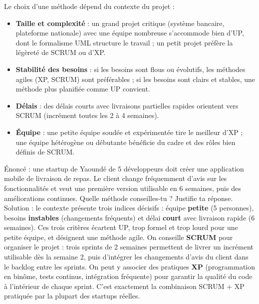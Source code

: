 \documentclass[11pt]{article}
\begin{document}
\begin{propriete}
Le choix d'une méthode dépend du contexte du projet :
\begin{itemize}
  \item \textbf{Taille et complexité} : un grand projet critique (système bancaire, plateforme nationale) avec une équipe nombreuse s'accommode bien d'UP, dont le formalisme UML structure le travail ; un petit projet préfère la légèreté de SCRUM ou d'XP.
  \item \textbf{Stabilité des besoins} : si les besoins sont flous ou évolutifs, les méthodes agiles (XP, SCRUM) sont préférables ; si les besoins sont clairs et stables, une méthode plus planifiée comme UP convient.
  \item \textbf{Délais} : des délais courts avec livraisons partielles rapides orientent vers SCRUM (incrément toutes les 2 à 4 semaines).
  \item \textbf{Équipe} : une petite équipe soudée et expérimentée tire le meilleur d'XP ; une équipe hétérogène ou débutante bénéficie du cadre et des rôles bien définis de SCRUM.
\end{itemize}
\end{propriete}

\begin{exoresolu}
Énoncé : une startup de Yaoundé de 5 développeurs doit créer une application mobile de livraison de repas. Le client change fréquemment d'avis sur les fonctionnalités et veut une première version utilisable en 6 semaines, puis des améliorations continues. Quelle méthode conseilles-tu ? Justifie ta réponse.
\tcblower
Solution : le contexte présente trois indices décisifs : équipe \textbf{petite} (5 personnes), besoins \textbf{instables} (changements fréquents) et délai \textbf{court} avec livraison rapide (6 semaines). Ces trois critères écartent UP, trop formel et trop lourd pour une petite équipe, et désignent une méthode agile. On conseille \textbf{SCRUM} pour organiser le projet : trois sprints de 2 semaines permettent de livrer un incrément utilisable dès la semaine 2, puis d'intégrer les changements d'avis du client dans le backlog entre les sprints. On peut y associer des pratiques \textbf{XP} (programmation en binôme, tests continus, intégration fréquente) pour garantir la qualité du code à l'intérieur de chaque sprint. C'est exactement la combinaison SCRUM + XP pratiquée par la plupart des startups réelles.
\end{exoresolu}
\end{document}
